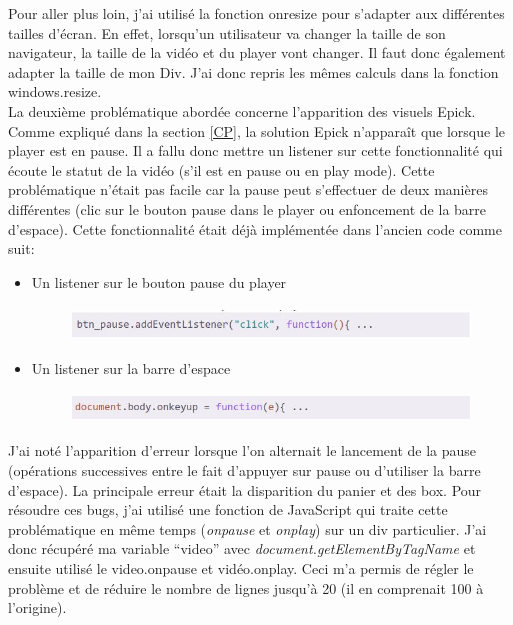 \documentclass[a4paper, 12pt]{report}
\begin{document}
\pagebreak
\newpage
Pour aller plus loin, j'ai utilisé la fonction  onresize pour s'adapter aux différentes tailles d’écran. En effet, lorsqu’un utilisateur va changer la taille de son navigateur, la taille de la vidéo et du player vont changer. Il faut donc également adapter la taille de mon Div. J’ai donc repris les mêmes calculs dans la fonction windows.resize.\\
La deuxième problématique abordée concerne l’apparition des visuels Epick. Comme expliqué dans la section \ref{CP}, la solution Epick n'apparaît que lorsque le player est en pause. Il a fallu donc mettre un listener sur cette fonctionnalité qui écoute le statut de la vidéo (s’il est en pause ou en play mode).
Cette problématique n'était pas facile car la pause peut s'effectuer de deux manières différentes (clic sur le bouton pause dans le player ou enfoncement de la barre d'espace). Cette fonctionnalité était déjà implémentée dans l'ancien code comme suit:
\begin{itemize}
\item Un listener sur le bouton pause du player  
\begin{figure}[!ht]
\begin{center}
\includegraphics[height=0.9cm]{images/1.jpg}
\end{center}
\end{figure}
\item Un listener sur la barre d'espace 
\begin{figure}[!ht]
\begin{center}
\includegraphics[height=0.8cm]{images/2.jpg}
\end{center}
\end{figure}
\end{itemize} 
J'ai noté l'apparition d'erreur lorsque l'on alternait le lancement de la pause (opérations successives entre le fait d'appuyer sur pause ou d'utiliser la barre d'espace). La principale erreur était la disparition du panier et des box.
Pour résoudre ces bugs, j’ai utilisé une fonction de JavaScript qui traite cette problématique  en même temps (\textit{onpause} et \textit{onplay}) sur un div particulier. J’ai donc récupéré ma variable “video” avec \textit{document.getElementByTagName} et ensuite utilisé le video.onpause et vidéo.onplay. 
Ceci m’a permis de régler le problème et de réduire le nombre de lignes jusqu'à 20 (il en comprenait 100 à l'origine).\\
\end{document}
